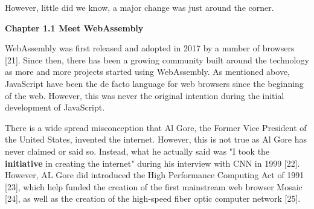 However, little did we know, a major change was just around the corner.
 
\bigskip
\bigskip

\textbf{{\Large Chapter 1.1 Meet WebAssembly}}

\bigskip

WebAssembly was first released and adopted in 2017 by a number of browsers [21]. Since then, there has been a growing community built around the technology as more and more projects started using WebAssembly. As mentioned above, JavaScript have been the de facto language for web browsers since the beginning of the web. However, this was never the original intention during the initial development of JavaScript.

There is a wide spread misconception that Al Gore, the Former Vice President of the United States, invented the internet. However, this is not true as Al Gore has never claimed or said so. Instead, what he actually said was "I took the \textbf{initiative} in creating the internet" during his interview with CNN in 1999 [22]. However, AL Gore did introduced the High Performance Computing Act of 1991 [23], which help funded the creation of the first mainstream web browser Mosaic [24], as well as the creation of the high-speed fiber optic computer network [25].

